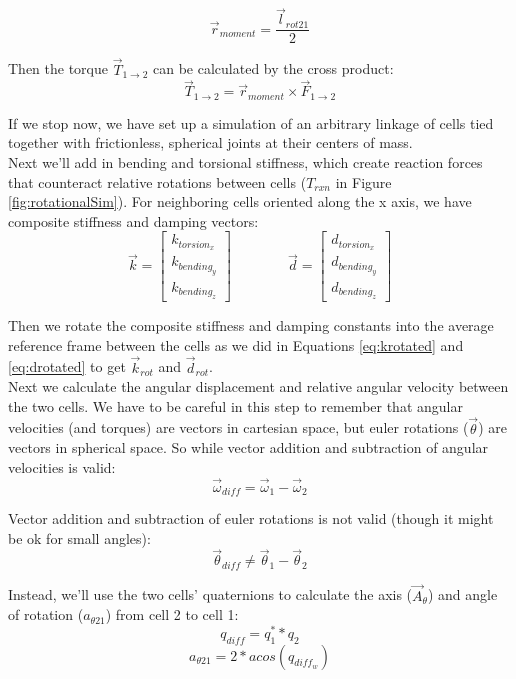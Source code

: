 {\[ \vec{r}_{moment} = \dfrac{\vec{l}_{rot21}}{2}\]

Then the torque $\vec{T}_{1\rightarrow2}$ can be calculated by the cross product:
\begin{equation}\label{eq:moment1to2}
\vec{T}_{1\rightarrow2} =  \vec{r}_{moment} \times \vec{F}_{1\rightarrow2}
\end{equation}

If we stop now, we have set up a simulation of an arbitrary linkage of cells tied together with frictionless, spherical joints at their centers of mass.\\

Next we'll add in bending and torsional stiffness, which create reaction forces that counteract relative rotations between cells ($T_{rxn}$ in Figure \ref{fig:rotationalSim}).  For neighboring cells oriented along the x axis, we have composite stiffness and damping vectors:
\[ \vec{k} =  \left[ \begin{array}{ccc}
k_{torsion_x}\\
k_{bending_{y}}\\
k_{bending_{z}}
 \end{array} \right]  
  \qquad\qquad
  \vec{d} =  \left[ \begin{array}{ccc}
d_{torsion_x}\\
d_{bending_{y}}\\
d_{bending_{z}}
 \end{array} \right] \] 

Then we rotate the composite stiffness and damping constants into the average reference frame between the cells as we did in Equations \ref{eq:krotated} and \ref{eq:drotated} to get $\vec{k}_{rot}$ and $\vec{d}_{rot}$.\\

Next we calculate the angular displacement and relative angular velocity between the two cells.  We have to be careful in this step to remember that angular velocities (and torques) are vectors in cartesian space, but euler rotations ($\vec{\theta}$) are vectors in spherical space.  So while vector addition and subtraction of angular velocities is valid:
\[ \vec{\omega}_{diff} = \vec{\omega}_1 - \vec{\omega}_2 \]

Vector addition and subtraction of euler rotations is not valid (though it might be ok for small angles):
\[ \vec{\theta}_{diff} \neq \vec{\theta}_1 - \vec{\theta}_2 \]

Instead, we'll use the two cells' quaternions to calculate the axis ($\vec{A}_{\theta}$) and angle of rotation ($a_{\theta21}$) from cell 2 to cell 1:
\begin{equation}\label{eq:qdiff}
q_{diff} = q_1^{*}*q_2 
\end{equation}
\[ a_{\theta21} = 2*acos(q_{diff_w}) \]

}
